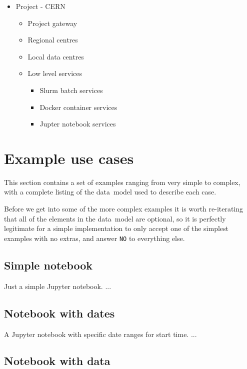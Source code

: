 \documentclass[11pt,a4paper]{ivoa}
\newcommand{\datamodel} {data~model}
\newcommand{\jupyter} {Jupyter}
\newcommand{\jupyternotebook} {Jupyter notebook}
\newcommand{\codeword}[1] {\texttt{#1}}
\begin{document}
\begin{itemize}
    \item Project - CERN
    \begin{itemize}
        \item Project gateway
        \item Regional centres
        \item Local data centres
        \item Low level services
        \begin{itemize}
            \item Slurm batch services
            \item Docker container services
            \item Jupter notebook services
        \end{itemize}
    \end{itemize}
\end{itemize}

\section{Example use cases}
\label{example-usecases}

This section contains a set of examples ranging from very simple to complex, with a complete
listing of the \datamodel{} used to describe each case.

Before we get into some of the more complex examples it is worth re-iterating that all of the
elements in the \datamodel{} are optional, so it is perfectly legitimate for a simple
implementation to only accept one of the simplest examples with no extras, and answer
\codeword{NO} to everything else.

\subsection{Simple notebook}
\label{simple-notebook}

Just a simple \jupyternotebook{}.
...

\subsection{Notebook with dates}
\label{notebook-with-dates}

A \jupyter{} notebook with specific date ranges for start time.
...

\subsection{Notebook with data}
\label{notebook-with-data}
\end{document}
